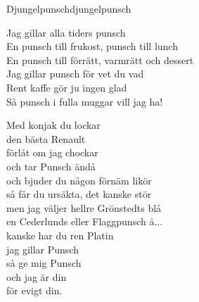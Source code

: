 \begin{song}{Djungelpunsch}{djungelpunsch}
\begin{vers}
Jag gillar alla tiders punsch\\
En punsch till frukost, punsch till lunch\\
En punsch till förrätt, varmrätt och dessert\\
Jag gillar punsch för vet du vad\\
Rent kaffe gör ju ingen glad\\
Så punsch i fulla muggar vill jag ha!\\
\end{vers}
\begin{vers}
Med konjak du lockar\\
den bästa Renault\\
förlåt om jag chockar\\
och tar Punsch ändå\\
och bjuder du någon förnäm likör\\
så får du ursäkta, det kanske stör\\
men jag väljer hellre Grönstedts blå\\
en Cederlunds eller Flaggpunsch å...\\
kanske har du ren Platin\\
jag gillar Punsch\\
så ge mig Punsch\\
och jag är din\\
för evigt din.\\
\end{vers}

\end{song}

